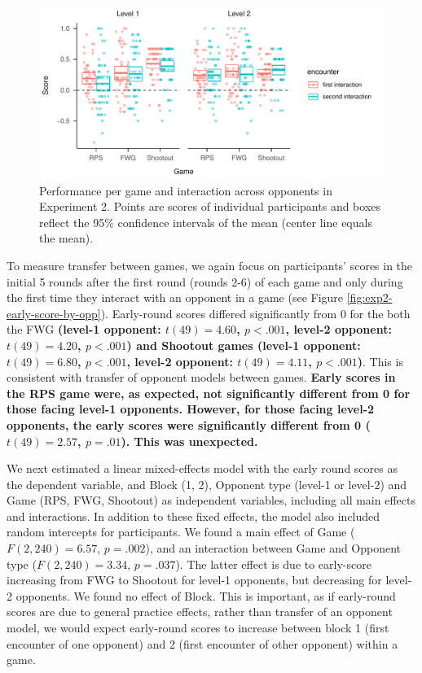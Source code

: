 \documentclass[smallextended]{svjour3}       %
\begin{document}
\begin{figure}

{\centering \includegraphics[width=\textwidth]{CBB_v2_files/figure-latex/exp2-score-by-opp-1} 

}

\caption{\label{fig:exp2-score-by-opp}Performance per game and interaction across opponents in Experiment 2. Points are scores of individual participants and boxes reflect the 95\% confidence intervals of the mean (center line equals the mean).}\label{fig:exp2-score-by-opp}
\end{figure}

To measure transfer between games, we again focus on participants'
scores in the initial 5 rounds after the first round (rounds 2-6) of
each game and only during the first time they interact with an opponent
in a game (see Figure \ref{fig:exp2-early-score-by-opp}). Early-round
scores differed significantly from 0 for the both the FWG
\textbf{(level-1 opponent: \(t(49) = 4.60\), \(p < .001\), level-2
opponent: \(t(49) = 4.20\), \(p < .001\)) and Shootout games (level-1
opponent: \(t(49) = 6.80\), \(p < .001\), level-2 opponent:
\(t(49) = 4.11\), \(p < .001\))}. This is consistent with transfer of
opponent models between games. \textbf{Early scores in the RPS game
were, as expected, not significantly different from 0 for those facing
level-1 opponents. However, for those facing level-2 opponents, the
early scores were significantly different from 0 (\(t(49) = 2.57\),
\(p = .01\)). This was unexpected.}

We next estimated a linear mixed-effects model with the early round
scores as the dependent variable, and Block (1, 2), Opponent type
(level-1 or level-2) and Game (RPS, FWG, Shootout) as independent
variables, including all main effects and interactions. In addition to
these fixed effects, the model also included random intercepts for
participants. We found a main effect of Game (\(F(2,240) = 6.57\),
\(p = .002\)), and an interaction between Game and Opponent type
(\(F(2,240) = 3.34\), \(p = .037\)). The latter effect is due to
early-score increasing from FWG to Shootout for level-1 opponents, but
decreasing for level-2 opponents. We found no effect of Block. This is
important, as if early-round scores are due to general practice effects,
rather than transfer of an opponent model, we would expect early-round
scores to increase between block 1 (first encounter of one opponent) and
2 (first encounter of other opponent) within a game.
\end{document}
